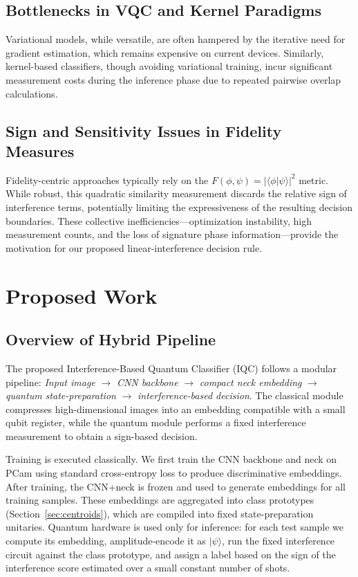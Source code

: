 \documentclass[conference]{IEEEtran}
\begin{document}
\subsection{Bottlenecks in VQC and Kernel Paradigms}
Variational models, while versatile, are often hampered by the iterative need for gradient estimation, which remains expensive on current devices. Similarly, kernel-based classifiers, though avoiding variational training, incur significant measurement costs during the inference phase due to repeated pairwise overlap calculations.

\subsection{Sign and Sensitivity Issues in Fidelity Measures}
Fidelity-centric approaches typically rely on the $F(\phi, \psi) = |\langle \phi | \psi \rangle|^2$ metric. While robust, this quadratic similarity measurement discards the relative sign of interference terms, potentially limiting the expressiveness of the resulting decision boundaries. These collective inefficiencies—optimization instability, high measurement counts, and the loss of signature phase information—provide the motivation for our proposed linear-interference decision rule.

\section{Proposed Work}

\subsection{Overview of Hybrid Pipeline}
The proposed Interference-Based Quantum Classifier (IQC) follows a modular pipeline: \emph{Input image} $\rightarrow$ \emph{CNN backbone} $\rightarrow$ \emph{compact neck embedding} $\rightarrow$ \emph{quantum state-preparation} $\rightarrow$ \emph{interference-based decision}. The classical module compresses high-dimensional images into an embedding compatible with a small qubit register, while the quantum module performs a fixed interference measurement to obtain a sign-based decision.

Training is executed classically. We first train the CNN backbone and neck on PCam using standard cross-entropy loss to produce discriminative embeddings. After training, the CNN+neck is frozen and used to generate embeddings for all training samples. These embeddings are aggregated into class prototypes (Section~\ref{sec:centroids}), which are compiled into fixed state-preparation unitaries. Quantum hardware is used only for inference: for each test sample we compute its embedding, amplitude-encode it as $|\psi\rangle$, run the fixed interference circuit against the class prototype, and assign a label based on the sign of the interference score estimated over a small constant number of shots.
\end{document}

